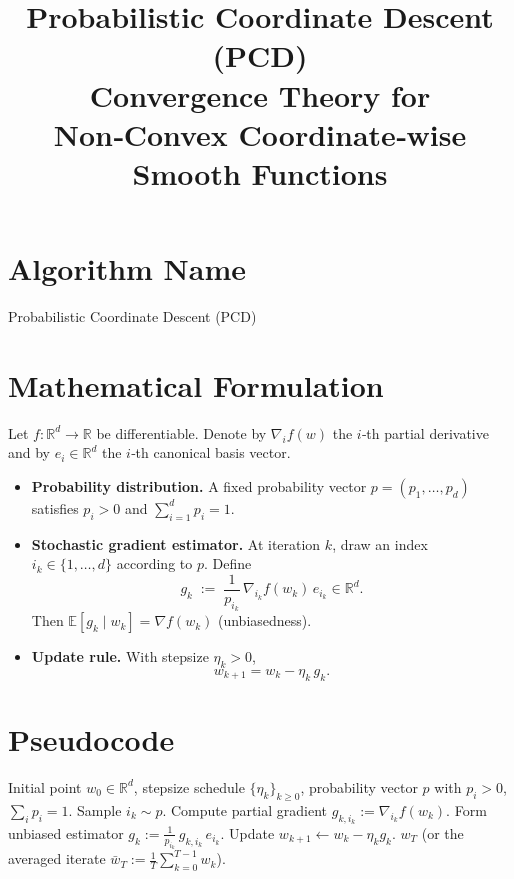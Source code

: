 \documentclass{article}
\begin{document}
\title{Probabilistic Coordinate Descent (PCD) \\ Convergence Theory for Non‑Convex Coordinate‑wise Smooth Functions}
\author{}
\date{}
\maketitle

\tableofcontents

\newpage

\section*{Algorithm Name}
Probabilistic Coordinate Descent (PCD)

\section*{Mathematical Formulation}
Let $f:\mathbb{R}^{d}\to\mathbb{R}$ be differentiable.  
Denote by $\nabla_i f(w)$ the $i$‑th partial derivative and by $e_i\in\mathbb{R}^d$ the $i$‑th canonical basis vector.  

\begin{itemize}
    \item \textbf{Probability distribution.} A fixed probability vector $p=(p_1,\dots ,p_d)$ satisfies $p_i>0$ and $\sum_{i=1}^{d}p_i=1$.
    \item \textbf{Stochastic gradient estimator.} At iteration $k$, draw an index $i_k\in\{1,\dots ,d\}$ according to $p$.  
    Define
    \[
        g_k \;:=\; \frac{1}{p_{i_k}}\,\nabla_{i_k} f(w_k)\,e_{i_k}\in\mathbb{R}^d .
    \]
    Then $\mathbb{E}[g_k\mid w_k]=\nabla f(w_k)$ (unbiasedness).
    \item \textbf{Update rule.} With stepsize $\eta_k>0$,
    \[
        w_{k+1}= w_k - \eta_k\, g_k .
    \]
\end{itemize}

\section*{Pseudocode}
\begin{algorithm}[H]
\caption{Probabilistic Coordinate Descent (PCD)}
\begin{algorithmic}[1]
\REQUIRE Initial point $w_0\in\mathbb{R}^d$, stepsize schedule $\{\eta_k\}_{k\ge0}$, probability vector $p$ with $p_i>0$, $ \sum_i p_i =1$.
    \STATE Sample $i_k\sim p$.
    \STATE Compute partial gradient $g_{k,i_k}:=\nabla_{i_k}f(w_k)$.
    \STATE Form unbiased estimator $g_k:=\frac{1}{p_{i_k}}\,g_{k,i_k}\,e_{i_k}$.
    \STATE Update $w_{k+1}\gets w_k-\eta_k g_k$.
\ENDFOR
\RETURN $w_T$ (or the averaged iterate $\bar w_T:=\frac1T\sum_{k=0}^{T-1}w_k$).
\end{algorithmic}
\end{algorithm}
\end{document}
